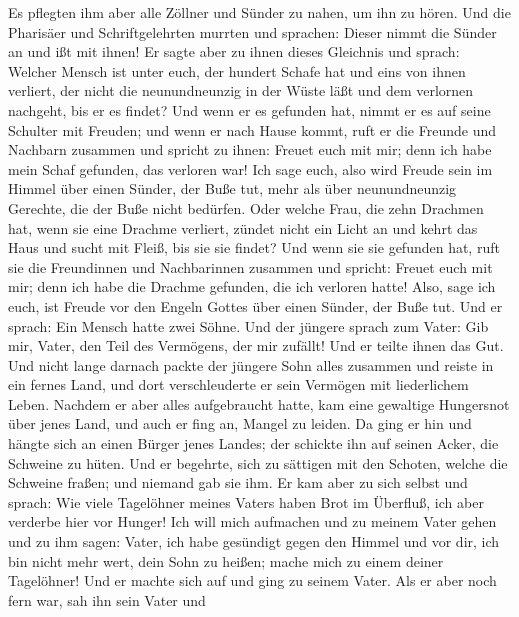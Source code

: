  Es pflegten ihm aber alle Zöllner und Sünder zu nahen, um
ihn zu hören.  Und die Pharisäer und Schriftgelehrten
murrten und sprachen: Dieser nimmt die Sünder an und ißt mit ihnen!
 Er sagte aber zu ihnen dieses Gleichnis und sprach:
 Welcher Mensch ist unter euch, der hundert Schafe hat und
eins von ihnen verliert, der nicht die neunundneunzig in der Wüste läßt
und dem verlornen nachgeht, bis er es findet?  Und wenn er
es gefunden hat, nimmt er es auf seine Schulter mit Freuden;
 und wenn er nach Hause kommt, ruft er die Freunde und
Nachbarn zusammen und spricht zu ihnen: Freuet euch mit mir; denn ich
habe mein Schaf gefunden, das verloren war!  Ich sage
euch, also wird Freude sein im Himmel über einen Sünder, der Buße tut,
mehr als über neunundneunzig Gerechte, die der Buße nicht bedürfen.
 Oder welche Frau, die zehn Drachmen hat, wenn sie eine
Drachme verliert, zündet nicht ein Licht an und kehrt das Haus und sucht
mit Fleiß, bis sie sie findet?  Und wenn sie sie gefunden
hat, ruft sie die Freundinnen und Nachbarinnen zusammen und spricht:
Freuet euch mit mir; denn ich habe die Drachme gefunden, die ich
verloren hatte!  Also, sage ich euch, ist Freude vor den
Engeln Gottes über einen Sünder, der Buße tut.  Und er
sprach: Ein Mensch hatte zwei Söhne.  Und der jüngere
sprach zum Vater: Gib mir, Vater, den Teil des Vermögens, der mir
zufällt! Und er teilte ihnen das Gut.  Und nicht lange
darnach packte der jüngere Sohn alles zusammen und reiste in ein fernes
Land, und dort verschleuderte er sein Vermögen mit liederlichem Leben.
 Nachdem er aber alles aufgebraucht hatte, kam eine
gewaltige Hungersnot über jenes Land, und auch er fing an, Mangel zu
leiden.  Da ging er hin und hängte sich an einen Bürger
jenes Landes; der schickte ihn auf seinen Acker, die Schweine zu hüten.
 Und er begehrte, sich zu sättigen mit den Schoten,
welche die Schweine fraßen; und niemand gab sie ihm.  Er
kam aber zu sich selbst und sprach: Wie viele Tagelöhner meines Vaters
haben Brot im Überfluß, ich aber verderbe hier vor Hunger!
 Ich will mich aufmachen und zu meinem Vater gehen und zu
ihm sagen: Vater, ich habe gesündigt gegen den Himmel und vor dir,
 ich bin nicht mehr wert, dein Sohn zu heißen; mache mich
zu einem deiner Tagelöhner!  Und er machte sich auf und
ging zu seinem Vater. Als er aber noch fern war, sah ihn sein Vater und
